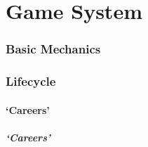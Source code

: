 \documentclass[letterpaper,serif]{rpg-module}
\begin{document}

\maketitle
          
%


\part{Game System}

\section{Basic Mechanics}

\section{Lifecycle}

\subsection{`Careers'}

\subsubsection{`Careers'}
\end{document}
